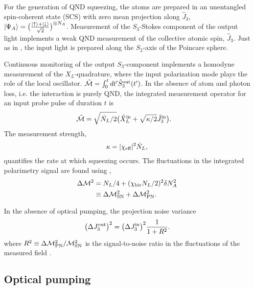 \documentclass[preprint,aps,pra,onecolumn]{revtex4-1} %
\newcommand{\inp}{{\rm in}}
\newcommand{\out}{{\rm out}}
\newcommand{\chibir}{\chi_{\rm bir}}
\newcommand{\shotnoise}{\Delta \mathcal{M}^2_{\rm SN}}
\newcommand{\projnoise}{\Delta \mathcal{M}^2_{\rm PN}}
\begin{document}
For the generation of QND squeezing, the atoms are prepared in an unentangled spin-coherent state (SCS) with zero mean projection along $\hat{J}_3$, $ \lvert{\Psi_A}\rangle = \big(\frac{\lvert{\uparrow}\rangle+\lvert{\downarrow}\rangle}{\sqrt{2}}\big) ^{\otimes N_A} $. Measurement of the $S_3$-Stokes component of the output light implements a weak QND measurement of the collective atomic spin, $ \hat{J}_3 $. Just as in , the input light is prepared along the $S_2$-axis of the Poincare sphere.  


Continuous monitoring of the output $S_3$-component implements a homodyne measurement of the $X_L$-quadrature, where the input polarization mode plays the role of the local oscillator.  $\hat{\mathcal{M}} = \int_0^t dt' \hat{S}^{\rm out}_3(t')$. In the absence of atom and photon loss, i.e. the interaction is purely QND, the integrated measurement operator for an input probe pulse of duration $t$ is \cite{vasilyev_quantum_2012}
	\begin{align} \label{Eq::OutputS3Squeeze}
		\hat{\mathcal{M}} & = \sqrt{\dot{N}_L/2} \big( \hat{X}_L^{\rm in} + \sqrt{\kappa/2} \hat{J}^\inp_3 \big).
	\end{align}
The measurement strength, 
	\begin{align}
		\kappa = |\chi_{\text{eff}}|^2 \dot{N}_L, 
	\end{align}
quantifies the rate at which squeezing occurs. The fluctuations in the integrated polarimetry signal are found using , 
	\begin{align}
		\Delta \mathcal{M}^2 &= N_L /4 + ( \chibir N_L /2 )^2 \delta N_A^2\label{Eq::MeasurementVariance}\\
			&\equiv \shotnoise + \projnoise.
	\end{align}

In the absence of optical pumping, the projection noise variance
	\begin{align}
		\big(\Delta J_3^\out \big)^2 = \big( \Delta J_3^\inp \big)^2 \frac{1}{1+R^2}.
	\end{align}
where $R^2 \equiv \Delta \mathcal{M}^2_{\rm PN}/\mathcal{M}^2_{\rm SN}$ is the signal-to-noise ratio in the fluctuations of the measured field \cite{deutsch_quantum_2010, baragiola_three-dimensional_2014}.  


	\subsection{Optical pumping}
	
\end{document}

